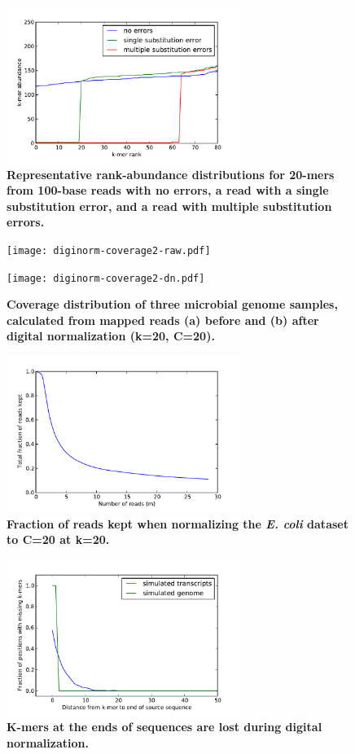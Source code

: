 \documentclass{pnastwo}
\begin{document}
\newpage

\begin{figure}
\centerline{\includegraphics[width=3in]{diginorm-ranks.pdf}}
\caption{
{\bf Representative rank-abundance distributions for 20-mers from 100-base reads with no errors,
a read with a single substitution error, and a read with multiple
substitution errors.}}
\label{fig:rankabund}
\end{figure}

\begin{figure}
\centerline{\texttt{[image: diginorm-coverage2-raw.pdf]}}
\centerline{\texttt{[image: diginorm-coverage2-dn.pdf]}}
\caption{
{\bf Coverage distribution of three microbial genome samples, calculated
from mapped reads (a) before and (b) after digital normalization (k=20, C=20).}}
\label{fig:coverage}
\end{figure}

\begin{figure}
\centerline{\includegraphics[width=3in]{diginorm-accumulation.pdf}}
\caption{
{\bf Fraction of reads kept when normalizing the {\em E. coli} dataset to C=20 at k=20.}}
\label{fig:accumulate}
\end{figure}

\begin{figure}
\centerline{\includegraphics[width=3in]{diginorm-endbias.pdf}}
\caption{
{\bf K-mers at the ends of sequences are lost during digital normalization.}}
\label{fig:endloss}
\end{figure}
\end{document}
